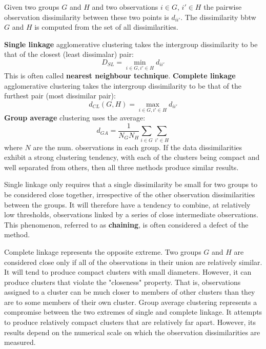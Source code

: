 \documentclass[12pt, letterpaper]{article}
\theoremstyle{definition}
\begin{document}
Given two groups $G$ and $H$ and two observations $i \in G$, $i' \in H$ the pairwise observation dissimilarity between these two points is $d_{ii'}$. The dissimilarity bbtw $G$ and $H$ is computed from the set of all dissimilarities.

\textbf{Single linkage} agglomerative clustering takes the intergroup dissimilarity to be that of the closest (least dissimalar) pair:
\begin{equation}
D_{SL} = \min_{i \in G, i' \in H} d_{ii'}
\end{equation}
This is often called \textbf{nearest neighbour technique}. \textbf{Complete linkage} agglomerative clustering  takes the intergroup dissimilarity to be that of the furthest pair (most dissimilar pair):
\begin{equation}
d_{CL} (G,H) = \max_{i \in G, i' \in H} d_{ii'}
\end{equation}
\textbf{Group average} clustering uses the average:
\begin{equation}
d_{GA} = \frac{1}{N_GN_H}\sum_{i \in G}\sum_{i' \in H}
\end{equation}
where $N$ are the num. observations in each group. If the data dissimilarities exhibit a strong clustering tendency, with each of the clusters being compact and well separated from others, then all three methods produce similar results.

Single linkage only requires that a single dissimilarity be small for two groups to be considered close together, irrespective of the other observation dissimilarities between the groups. It will therefore have a tendency to combine, at relatively low thresholds, observations linked by a series of close intermediate observations. This phenomenon, referred to as \textbf{chaining}, is often considered a defect of the method.

Complete linkage represents the opposite extreme. Two groups $G$ and $H$ are considered close only if all of the observations in their union are relatively similar. It will tend to produce compact clusters with small diameters.
However, it can produce clusters that violate the "closeness" property. That is, observations assigned to a cluster can be much closer to members of other clusters than they are to some members of their own cluster.
Group average clustering represents a compromise between the two extremes of single and complete linkage. It attempts to produce relatively compact clusters that are relatively far apart. However, its results depend on the numerical scale on which the observation dissimilarities are measured.
\end{document}
